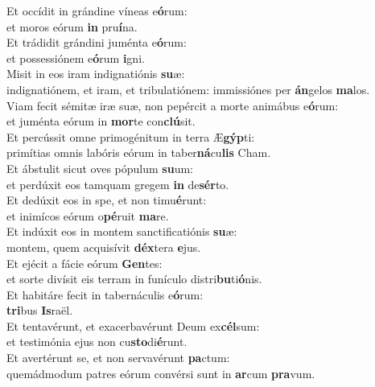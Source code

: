 \evenverse Et occídit in grándine víneas e\textbf{ó}rum:~\*\\
\evenverse et moros eórum \textbf{in} pru\textbf{í}na.\\
\oddverse Et trádidit grándini juménta e\textbf{ó}rum:~\*\\
\oddverse et possessiónem e\textbf{ó}rum \textbf{i}gni.\\
\evenverse Misit in eos iram indignatiónis \textbf{su}æ:~\*\\
\evenverse indignatiónem, et iram, et tribulatiónem: immissiónes per \textbf{án}gelos \textbf{ma}los.\\
\oddverse Viam fecit sémitæ iræ suæ, non pepércit a morte animábus e\textbf{ó}rum:~\*\\
\oddverse et juménta eórum in \textbf{mor}te con\textbf{clú}sit.\\
\evenverse Et percússit omne primogénitum in terra Æ\textbf{gýp}ti:~\*\\
\evenverse primítias omnis labóris eórum in taber\textbf{ná}cu\textbf{lis} Cham.\\
\oddverse Et ábstulit sicut oves pópulum \textbf{su}um:~\*\\
\oddverse et perdúxit eos tamquam gregem \textbf{in} de\textbf{sér}to.\\
\evenverse Et dedúxit eos in spe, et non timu\textbf{é}runt:~\*\\
\evenverse et inimícos eórum o\textbf{pé}ruit \textbf{ma}re.\\
\oddverse Et indúxit eos in montem sanctificatiónis \textbf{su}æ:~\*\\
\oddverse montem, quem acquisívit \textbf{déx}tera \textbf{e}jus.\\
\evenverse Et ejécit a fácie eórum \textbf{Gen}tes:~\*\\
\evenverse et sorte divísit eis terram in funículo distri\textbf{bu}ti\textbf{ó}nis.\\
\oddverse Et habitáre fecit in tabernáculis e\textbf{ó}rum:~\*\\
\oddverse \textbf{tri}bus \textbf{Is}raël.\\
\evenverse Et tentavérunt, et exacerbavérunt Deum ex\textbf{cél}sum:~\*\\
\evenverse et testimónia ejus non cu\textbf{sto}di\textbf{é}runt.\\
\oddverse Et avertérunt se, et non servavérunt \textbf{pa}ctum:~\*\\
\oddverse quemádmodum patres eórum convérsi sunt in \textbf{ar}cum \textbf{pra}vum.\\
